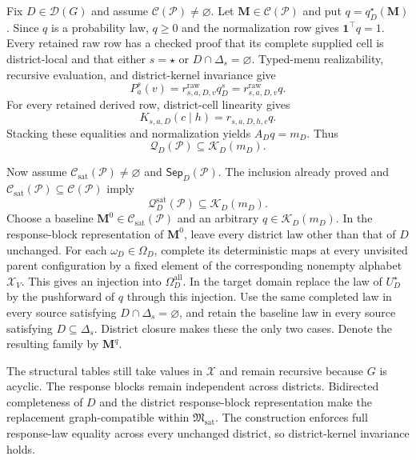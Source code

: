 Fix \(D\in\mathcal D(G)\) and assume \(\mathcal C(\mathcal P)\ne\varnothing\). Let \(\mathbf M\in\mathcal C(\mathcal P)\) and put \(q=q_D^\star(\mathbf M)\). Since \(q\) is a probability law, \(q\geq0\) and the normalization row gives \(\mathbf 1^\top q=1\). Every retained raw row has a checked proof that its complete supplied cell is district-local and that either \(s=\star\) or \(D\cap\Delta_s=\varnothing\). Typed-menu realizability, recursive evaluation, and district-kernel invariance give
\[
P_a^s(v)=r^{\mathrm{raw}}_{s,a,D,v}q_D^s
=r^{\mathrm{raw}}_{s,a,D,v}q.
\]
For every retained derived row, district-cell linearity gives
\[
K_{s,a,D}(c\mid h)=r_{s,a,D,h,c}q.
\]
Stacking these equalities and normalization yields \(A_Dq=m_D\). Thus
\[
\mathcal Q_D(\mathcal P)\subseteq\mathcal K_D(m_D).
\]

Now assume \(\mathcal C_{\mathrm{sat}}(\mathcal P)\ne\varnothing\) and \(\mathsf{Sep}_D(\mathcal P)\). The inclusion already proved and \(\mathcal C_{\mathrm{sat}}(\mathcal P)\subseteq\mathcal C(\mathcal P)\) imply
\[
\mathcal Q_D^{\mathrm{sat}}(\mathcal P)\subseteq\mathcal K_D(m_D).
\]
Choose a baseline \(\mathbf M^0\in\mathcal C_{\mathrm{sat}}(\mathcal P)\) and an arbitrary \(q\in\mathcal K_D(m_D)\). In the response-block representation of \(\mathbf M^0\), leave every district law other than that of \(D\) unchanged. For each \(\omega_D\in\Omega_D\), complete its deterministic maps at every unvisited parent configuration by a fixed element of the corresponding nonempty alphabet \(\mathcal X_V\). This gives an injection into \(\Omega_D^{\mathrm{all}}\). In the target domain replace the law of \(U_D^\star\) by the pushforward of \(q\) through this injection. Use the same completed law in every source satisfying \(D\cap\Delta_s=\varnothing\), and retain the baseline law in every source satisfying \(D\subseteq\Delta_s\). District closure makes these the only two cases. Denote the resulting family by \(\mathbf M^q\).

The structural tables still take values in \(\mathcal X\) and remain recursive because \(G\) is acyclic. The response blocks remain independent across districts. Bidirected completeness of \(D\) and the district response-block representation make the replacement graph-compatible within \(\mathfrak M_{\mathrm{sat}}\). The construction enforces full response-law equality across every unchanged district, so district-kernel invariance holds.

